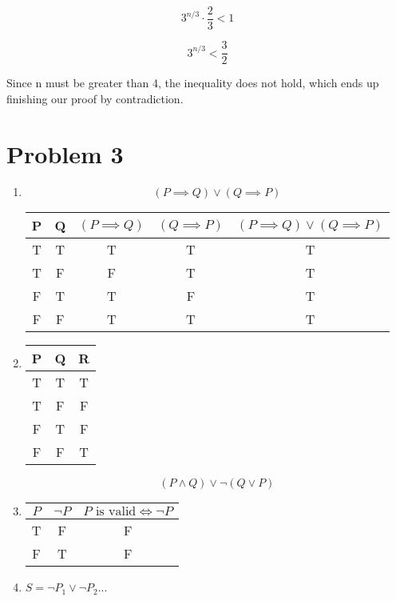 \documentclass{article}
\begin{document}
\[
  3^{n/3} \cdot \frac{2}{3} < 1
\]

\[
  3^{n/3} < \frac{3}{2}
\]

Since n must be greater than 4, the inequality does not hold, which ends up finishing our proof by contradiction.
\section*{Problem 3}

\begin{enumerate}[label=\alph*.]
  \setlength{\itemindent}{0pt}
  \item
        \[
          (P \implies Q) \lor (Q \implies P)
        \]

        \begin{tabular}{|c|c|c|c|c|}
          \hline
          P & Q & $(P \implies Q)$ & $(Q \implies P)$ & $(P \implies Q) \lor (Q \implies P)$ \\
          \hline
          T & T & T                & T                & T                                    \\
          \hline
          T & F & F                & T                & T                                    \\
          \hline
          F & T & T                & F                & T                                    \\
          \hline
          F & F & T                & T                & T                                    \\
          \hline
        \end{tabular}

  \item
        \begin{tabular}{|c|c|c|}
          \hline
          P & Q & R \\
          \hline
          T & T & T \\
          \hline
          T & F & F \\
          \hline
          F & T & F \\
          \hline
          F & F & T \\
          \hline
        \end{tabular}

        \[
          (P \land Q) \lor \lnot (Q \lor P)
        \]
  \item
        \begin{tabular}{|c|c|c|}
          \hline
          $P$ & $\lnot P$ & $P \text{ is valid} \iff \lnot P$ \\
          \hline
          T   & F         & F                                 \\
          \hline
          F   & T         & F                                 \\
          \hline
        \end{tabular}
  \item $S = \lnot P_1 \lor \lnot P_2 ...$
\end{enumerate}
\end{document}
